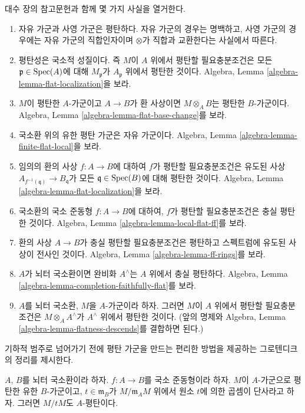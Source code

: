 \noindent
대수 장의 참고문헌과 함께 몇 가지 사실을 열거한다.
\begin{enumerate}
\item 자유 가군과 사영 가군은 평탄하다. 자유 가군의 경우는
명백하고, 사영 가군의 경우에는 자유 가군의 직합인자이며
$\otimes$가 직합과 교환한다는 사실에서 따른다.
\item 평탄성은 국소적 성질이다. 즉 $M$이 $A$ 위에서 평탄할 필요충분조건은
모든 $\mathfrak p \in \mathop{\mathrm{Spec}}(A)$에 대해 $M_{\mathfrak p}$가
$A_{\mathfrak p}$ 위에서 평탄한 것이다.
Algebra, Lemma \ref{algebra-lemma-flat-localization}을 보라.
\item $M$이 평탄한 $A$-가군이고 $A \to B$가 환 사상이면
$M \otimes_A B$는 평탄한 $B$-가군이다. Algebra, Lemma
\ref{algebra-lemma-flat-base-change}를 보라.
\item 국소환 위의 유한 평탄 가군은 자유 가군이다.
Algebra, Lemma \ref{algebra-lemma-finite-flat-local}을 보라.
\item 임의의 환의 사상 $f : A \to B$에 대하여 $f$가 평탄할
필요충분조건은 유도된 사상
$A_{f^{-1}(\mathfrak q)} \to B_{\mathfrak q}$가 모든
$\mathfrak q \in \mathop{\mathrm{Spec}}(B)$에 대해 평탄한 것이다.
Algebra, Lemma \ref{algebra-lemma-flat-localization}을 보라.
\item 국소환의 국소 준동형 $f : A \to B$에 대하여, $f$가 평탄할 필요충분조건은
충실 평탄한 것이다.
Algebra, Lemma \ref{algebra-lemma-local-flat-ff}를 보라.
\item 환의 사상 $A \to B$가 충실 평탄할 필요충분조건은 평탄하고
스펙트럼에 유도된 사상이 전사인 것이다.
Algebra, Lemma \ref{algebra-lemma-ff-rings}를 보라.
\item $A$가 뇌터 국소환이면 완비화 $A^\wedge$는 $A$ 위에서
충실 평탄하다.
Algebra, Lemma \ref{algebra-lemma-completion-faithfully-flat}를 보라.
\item $A$를 뇌터 국소환, $M$을 $A$-가군이라 하자.
그러면 $M$이 $A$ 위에서 평탄할 필요충분조건은
$M \otimes_A A^\wedge$가 $A^\wedge$ 위에서 평탄한 것이다.
(앞의 명제와 Algebra, Lemma
\ref{algebra-lemma-flatness-descends}를 결합하면 된다.)
\end{enumerate}
기하적 범주로 넘어가기 전에 평탄 가군을 만드는 편리한 방법을
제공하는 그로텐디크의 정리를 제시한다.

\begin{theorem}
\label{theorem-flatness-grothendieck}
$A$, $B$를 뇌터 국소환이라 하자.
$f : A \to B$를 국소 준동형이라 하자.
$M$이 $A$-가군으로 평탄한 유한 $B$-가군이고,
$t \in \mathfrak m_B$가 $M/\mathfrak m_AM$ 위에서 원소 $t$에 의한 곱셈이
단사라고 하자. 그러면 $M/tM$도 $A$-평탄이다.
\end{theorem}

